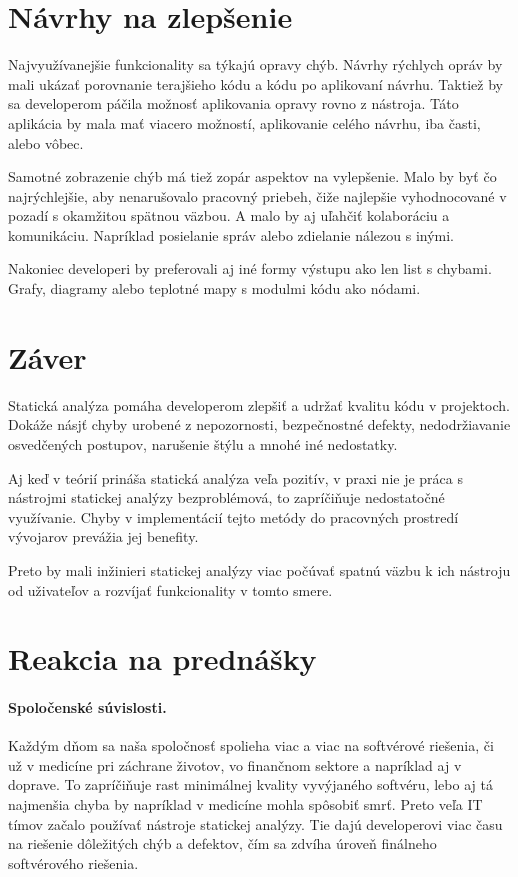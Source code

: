 \documentclass[10pt,twoside,slovak,a4paper]{article}
\begin{document}
\section{Návrhy na zlepšenie} \label{navrhy}
Najvyužívanejšie funkcionality sa týkajú opravy chýb. Návrhy rýchlych opráv by mali ukázať porovnanie terajšieho kódu a
kódu po aplikovaní návrhu. Taktiež by sa developerom páčila možnosť aplikovania opravy rovno z nástroja. Táto aplikácia
by mala mať viacero možností, aplikovanie celého návrhu, iba časti, alebo vôbec.

Samotné zobrazenie chýb má tiež zopár aspektov na vylepšenie. Malo by byť čo najrýchlejšie, aby nenarušovalo pracovný
priebeh, čiže najlepšie vyhodnocované v pozadí s okamžitou spätnou väzbou. A malo by aj uľahčiť kolaboráciu a
komunikáciu. Napríklad posielanie správ alebo zdielanie nálezou s inými.

Nakoniec developeri by preferovali aj iné formy výstupu ako len list s chybami. Grafy, diagramy alebo teplotné mapy
s modulmi kódu ako nódami.\cite{BrittanyJohnson,LisaNguyen}


\section{Záver}
Statická analýza pomáha developerom zlepšiť a udržať kvalitu kódu v projektoch. Dokáže násjť chyby urobené z
nepozornosti, bezpečnostné defekty, nedodržiavanie osvedčených postupov, narušenie štýlu a mnohé iné nedostatky.

Aj keď v teórií prináša statická analýza veľa pozitív, v praxi nie je práca s nástrojmi statickej analýzy
bezproblémová, to zapríčiňuje nedostatočné využívanie. Chyby v implementácií tejto metódy do pracovných prostredí
vývojarov prevážia jej benefity.

Preto by mali inžinieri statickej analýzy viac počúvať spatnú väzbu k ich nástroju od uživateľov a rozvíjať
funkcionality v tomto smere.




\section*{Reakcia na prednášky}
\paragraph{Spoločenské súvislosti.}
Každým dňom sa naša spoločnosť spolieha viac a viac na softvérové riešenia, či už v medicíne pri záchrane životov,
vo finančnom sektore a napríklad aj v doprave. To zapríčiňuje rast minimálnej kvality vyvýjaného softvéru, lebo aj
tá najmenšia chyba by napríklad v medicíne mohla spôsobiť smrť. Preto veľa IT tímov začalo používať nástroje
statickej analýzy. Tie dajú developerovi viac času na riešenie dôležitých chýb a defektov, čím sa zdvíha úroveň
finálneho softvérového riešenia.
\end{document}
